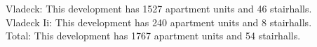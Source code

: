 {Vladeck}: This development has 1527 apartment units and 46 stairhalls.\\{Vladeck Ii}: This development has 240 apartment units and 8 stairhalls.\\{Total}: This development has 1767 apartment units and 54 stairhalls.\\